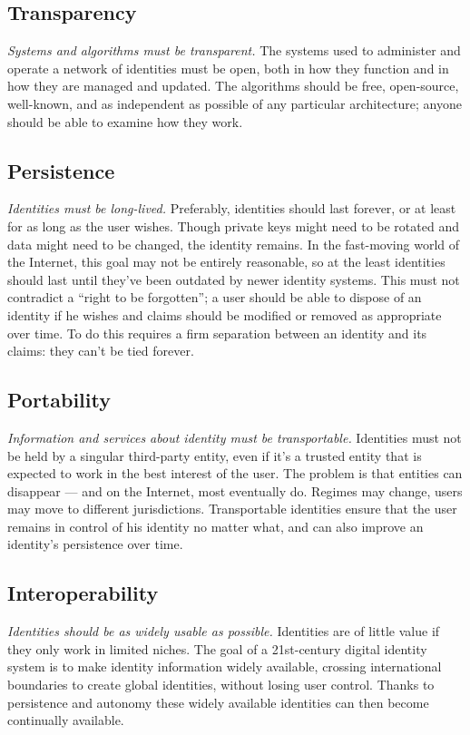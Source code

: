 \subsection{Transparency} \textit{Systems and algorithms must be transparent.} The systems used to administer and operate a network of identities must be open, both in how they function and in how they are managed and updated. The algorithms should be free, open-source, well-known, and as independent as possible of any particular architecture; anyone should be able to examine how they work.
\subsection{Persistence} \textit{Identities must be long-lived.} Preferably, identities should last forever, or at least for as long as the user wishes. Though private keys might need to be rotated and data might need to be changed, the identity remains. In the fast-moving world of the Internet, this goal may not be entirely reasonable, so at the least identities should last until they’ve been outdated by newer identity systems. This must not contradict a “right to be forgotten”; a user should be able to dispose of an identity if he wishes and claims should be modified or removed as appropriate over time. To do this requires a firm separation between an identity and its claims: they can't be tied forever.
\subsection{Portability} \textit{Information and services about identity must be transportable.} Identities must not be held by a singular third-party entity, even if it's a trusted entity that is expected to work in the best interest of the user. The problem is that entities can disappear — and on the Internet, most eventually do. Regimes may change, users may move to different jurisdictions. Transportable identities ensure that the user remains in control of his identity no matter what, and can also improve an identity’s persistence over time.
\subsection{Interoperability} \textit{Identities should be as widely usable as possible.} Identities are of little value if they only work in limited niches. The goal of a 21st-century digital identity system is to make identity information widely available, crossing international boundaries to create global identities, without losing user control. Thanks to persistence and autonomy these widely available identities can then become continually available.
